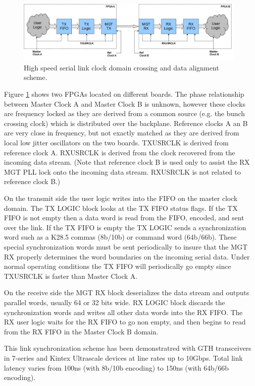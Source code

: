 \documentclass[letterpaper]{article}
\begin{document}
\begin{figure}
\centering
\includegraphics[width=15cm]{link_cdc.png}
\caption{High speed serial link clock domain crossing and data alignment scheme.}
\label{link_cdc}
\end{figure}

Figure \ref{link_cdc} shows two FPGAs located on different boards.  The phase relationship between Master Clock A and Master Clock B is unknown, however these clocks are frequency locked as they are derived from a common source (e.g. the bunch crossing clock) which is distributed over the backplane.  Reference clocks A an B are very close in frequency, but not exactly matched as they are derived from local low jitter oscillators on the two boards.  TXUSRCLK is derived from reference clock A.  RXUSRCLK is derived from the clock recovered from the incoming data stream.  (Note that reference clock B is used only to assist the RX MGT PLL lock onto the incoming data stream. RXUSRCLK is not related to reference clock B.)

On the transmit side the user logic writes into the FIFO on the master clock domain.  The TX LOGIC block looks at the TX FIFO status flags.  If the TX FIFO is not empty then a data word is read from the FIFO, encoded, and sent over the link.  If the TX FIFO is empty the TX LOGIC sends a synchronization word such as a K28.5 commas (8b/10b) or command word (64b/66b).  These special synchronization words must be sent periodically to insure that the MGT RX properly determines the word boundaries on the incoming serial data.  Under normal operating conditions the TX FIFO will periodically go empty since TXUSRCLK is faster than Master Clock A.

On the receive side the MGT RX block deserializes the data stream and outputs parallel words, usually 64 or 32 bits wide.  RX LOGIC block discards the synchronization words and writes all other data words into the RX FIFO.  The RX user logic waits for the RX FIFO to go non empty, and then begins to read from the RX FIFO in the Master Clock B domain.

This link synchronization scheme has been demonstratred with GTH transceivers in 7-series and Kintex Ultrascale devices at line rates up to 10Gbps.  Total link latency varies from 100ns (with 8b/10b encoding) to 150ns (with 64b/66b encoding).
\end{document}
